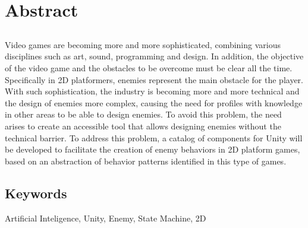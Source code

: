 \chapter*{Abstract}

\section*{\tituloPortadaEngVal}
Video games are becoming more and more sophisticated, combining various disciplines such as art, sound, programming and design. In addition, the objective of the video game and the obstacles to be overcome must be clear all the time. Specifically in 2D platformers, enemies represent the main obstacle for the player. With such sophistication, the industry is becoming more and more technical and the design of enemies more complex, causing the need for profiles with knowledge in other areas to be able to design enemies. To avoid this problem, the need arises to create an accessible tool that allows designing enemies without the technical barrier. To address this problem, a catalog of components for Unity will be developed to facilitate the creation of enemy behaviors in 2D platform games, based on an abstraction of behavior patterns identified in this type of games.
\section*{Keywords}

\noindent  Artificial Inteligence, Unity, Enemy, State Machine, 2D



